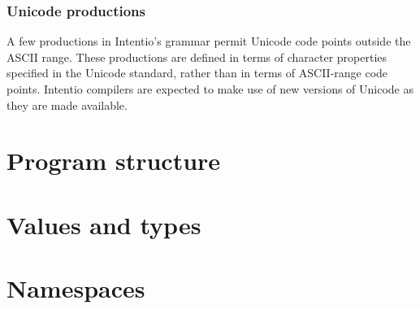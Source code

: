 \subsubsection{Unicode productions}

A few productions in Intentio's grammar permit Unicode\cite{Unicode6} code points outside the ASCII range. These productions are defined in terms of character properties specified in the Unicode standard, rather than in terms of ASCII-range code points. Intentio compilers are expected to make use of new versions of Unicode as they are made available.


\section{Program structure}



\section{Values and types}



\section{Namespaces}

